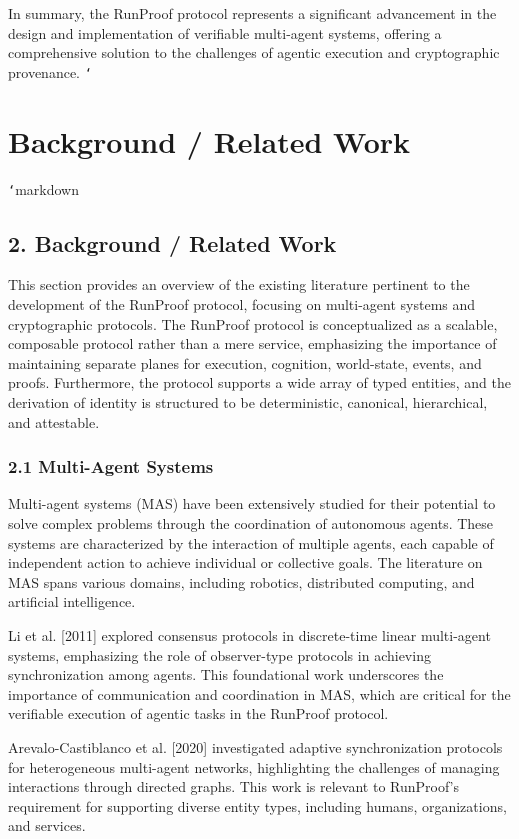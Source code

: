\documentclass[11pt]{article}
\begin{document}
In summary, the RunProof protocol represents a significant advancement in the design and implementation of verifiable multi-agent systems, offering a comprehensive solution to the challenges of agentic execution and cryptographic provenance.
\texttt{`}


\section{Background / Related Work}
\texttt{`}markdown
\subsection{2. Background / Related Work}

This section provides an overview of the existing literature pertinent to the development of the RunProof protocol, focusing on multi-agent systems and cryptographic protocols. The RunProof protocol is conceptualized as a scalable, composable protocol rather than a mere service, emphasizing the importance of maintaining separate planes for execution, cognition, world-state, events, and proofs. Furthermore, the protocol supports a wide array of typed entities, and the derivation of identity is structured to be deterministic, canonical, hierarchical, and attestable.

\subsubsection{2.1 Multi-Agent Systems}

Multi-agent systems (MAS) have been extensively studied for their potential to solve complex problems through the coordination of autonomous agents. These systems are characterized by the interaction of multiple agents, each capable of independent action to achieve individual or collective goals. The literature on MAS spans various domains, including robotics, distributed computing, and artificial intelligence.

Li et al. [2011] explored consensus protocols in discrete-time linear multi-agent systems, emphasizing the role of observer-type protocols in achieving synchronization among agents. This foundational work underscores the importance of communication and coordination in MAS, which are critical for the verifiable execution of agentic tasks in the RunProof protocol.

Arevalo-Castiblanco et al. [2020] investigated adaptive synchronization protocols for heterogeneous multi-agent networks, highlighting the challenges of managing interactions through directed graphs. This work is relevant to RunProof's requirement for supporting diverse entity types, including humans, organizations, and services.
\end{document}
